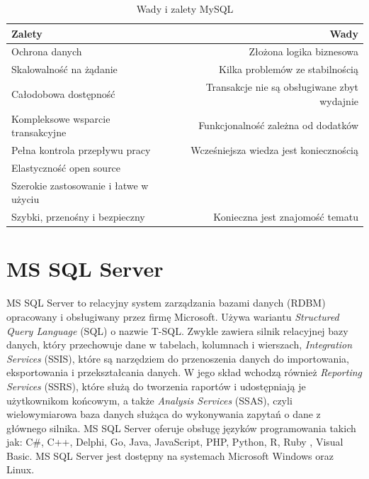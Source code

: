 \documentclass[oneside,polski,logo,indent]{amuthesis}
\begin{document}
\begin{table}[H]
\caption{Wady i zalety MySQL}
\label{tabela-MySQL}
\centering
\begin{adjustbox}{width=1\textwidth}
\small
\begin{tabular}{lr}
\toprule
Zalety & Wady\\
\midrule
Ochrona danych & Złożona logika biznesowa\\
Skalowalność na żądanie & Kilka problemów ze stabilnością\\
Całodobowa dostępność & Transakcje nie są obsługiwane zbyt wydajnie\\
Kompleksowe wsparcie transakcyjne & Funkcjonalność zależna od dodatków\\
Pełna kontrola przepływu pracy & Wcześniejsza wiedza jest koniecznością\\
Elastyczność open source &\\
Szerokie zastosowanie i łatwe w użyciu &\\
Szybki, przenośny i bezpieczny & Konieczna jest znajomość tematu\\
\bottomrule
\end{tabular}
\end{adjustbox}
\end{table}
\section{MS SQL Server}
MS SQL Server to relacyjny system zarządzania bazami danych (RDBM) opracowany i obsługiwany przez firmę Microsoft. Używa wariantu \emph{Structured Query Language} (SQL) o nazwie T-SQL. Zwykle zawiera silnik relacyjnej bazy danych, który przechowuje dane w tabelach, kolumnach i wierszach,  \emph{Integration Services} (SSIS), które są narzędziem do przenoszenia danych do importowania, eksportowania i przekształcania danych. W jego skład wchodzą również \emph{Reporting Services} (SSRS), które służą do tworzenia raportów i udostępniają je użytkownikom końcowym, a także  \emph{Analysis Services} (SSAS), czyli wielowymiarowa baza danych służąca do wykonywania zapytań o dane z głównego silnika.
MS SQL Server oferuje obsługę języków programowania takich jak: C\#, C++, Delphi, Go, Java, JavaScript, PHP, Python, R, Ruby , Visual Basic.
MS SQL Server jest dostępny na systemach Microsoft Windows oraz Linux.
\end{document}
